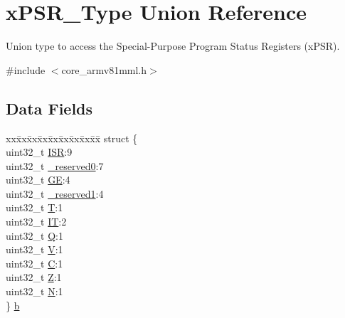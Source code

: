 \hypertarget{unionx_p_s_r___type}{}\section{x\+P\+S\+R\+\_\+\+Type Union Reference}
\label{unionx_p_s_r___type}


Union type to access the Special-\/\+Purpose Program Status Registers (x\+P\+SR).  




{\ttfamily \#include $<$core\+\_\+armv81mml.\+h$>$}

\subsection*{Data Fields}
\begin{DoxyCompactItemize}
\item 
\begin{tabbing}
xx\=xx\=xx\=xx\=xx\=xx\=xx\=xx\=xx\=\kill
struct \{\\
\>uint32\_t \mbox{\hyperlink{unionx_p_s_r___type_ad502ba7dbb2aab5f87c782b28f02622d}{ISR}}:9\\
\>uint32\_t \mbox{\hyperlink{unionx_p_s_r___type_ac8a6a13838a897c8d0b8bc991bbaf7c1}{\_reserved0}}:7\\
\>uint32\_t \mbox{\hyperlink{unionx_p_s_r___type_aa91800ec6e90e457c7a1acd1f2e17099}{GE}}:4\\
\>uint32\_t \mbox{\hyperlink{unionx_p_s_r___type_a959a73d8faee56599b7e792a7c5a2d16}{\_reserved1}}:4\\
\>uint32\_t \mbox{\hyperlink{unionx_p_s_r___type_a6e1cf12e53a20224f6f62c001d9be972}{T}}:1\\
\>uint32\_t \mbox{\hyperlink{unionx_p_s_r___type_a76485660fe8ad98cdc71ddd7cb0ed777}{IT}}:2\\
\>uint32\_t \mbox{\hyperlink{unionx_p_s_r___type_a65f27ddc4f7e09c14ce7c5211b2e000a}{Q}}:1\\
\>uint32\_t \mbox{\hyperlink{unionx_p_s_r___type_acd4a2b64faee91e4a9eef300667fa222}{V}}:1\\
\>uint32\_t \mbox{\hyperlink{unionx_p_s_r___type_a7a1caf92f32fe9ebd8d1fe89b06c7776}{C}}:1\\
\>uint32\_t \mbox{\hyperlink{unionx_p_s_r___type_a5ae954cbd9986cd64625d7fa00943c8e}{Z}}:1\\
\>uint32\_t \mbox{\hyperlink{unionx_p_s_r___type_abae0610bc2a97bbf7f689e953e0b451f}{N}}:1\\
\} \mbox{\hyperlink{unionx_p_s_r___type_a8d8c45d946ef8df11f4cac72c667e98b}{b}}\\


\end{tabbing}
\end{DoxyCompactItemize}
